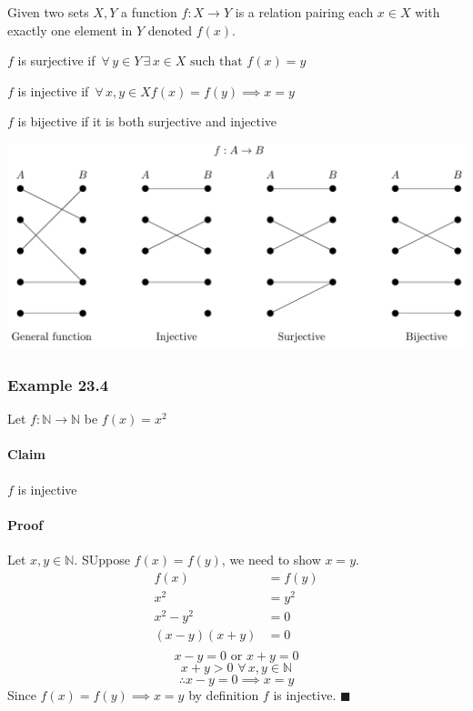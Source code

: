 \documentclass{article}
\newcommand{\bb}[1]{\mathbb{#1}}
\newcommand{\A}{\,\forall\,}
\newcommand{\E}{\,\exists\,}
\begin{document}
Given two sets \(X,Y\) a function \(f:X\to Y\) is a relation pairing each \(x\in X\) with exactly one element in \(Y\) denoted \(f(x)\).

\(f\) is surjective if \(\displaystyle{\A y\in Y\E x\in X\text{ such that }f(x)=y}\)

\(f\) is injective if \(\displaystyle{\A x,y\in X f(x)=f(y)\implies x=y}\)

\(f\) is bijective if it is both surjective and injective

\begin{center}
\includegraphics[scale=0.25]{Functions}
\end{center}

\subsubsection*{Example 23.4}

Let \(f:\bb N\to\bb N\) be \(f(x)=x^2\)

\paragraph{Claim} \(f\) is injective

\paragraph{Proof} Let \(x,y\in\bb N\). SUppose \(f(x)=f(y)\), we need to show \(x=y\).
\begin{align*}
f(x)&=f(y)\\
x^2&=y^2\\
x^2-y^2&=0\\
(x-y)(x+y)&=0\\
\end{align*}
\[x-y=0\text{ or }x+y=0\]
\[x+y>0\,\A x,y\in\bb N\]
\[\therefore x-y=0\implies x=y\]
Since \(f(x)=f(y)\implies x=y\) by definition \(f\) is injective. \(\blacksquare\)
\end{document}
